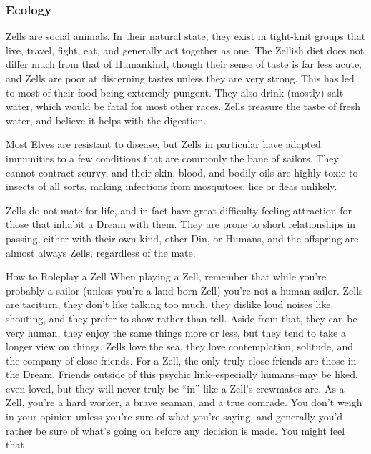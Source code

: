 \documentclass[oneside,11pt,english]{book}
\begin{document}
 

\subsubsection*{Ecology} 
Zells are social animals. In their natural state, they exist in tight-knit groups that live, travel, fight, eat, and 
generally act together as one. The Zellish diet does not differ much from that of Humankind, though their 
sense of taste is far less acute, and Zells are poor at discerning tastes unless they are very strong. This has 
led to most of their food being extremely pungent. They also drink (mostly) salt water, which would be 
fatal for most other races. Zells treasure the taste of fresh water, and believe it helps with the digestion. 

 

Most Elves are resistant to disease, but Zells in particular have adapted immunities to a few conditions 
that are commonly the bane of sailors. They cannot contract scurvy, and their skin, blood, and bodily oils 
are highly toxic to insects of all sorts, making infections from mosquitoes, lice or fleas unlikely. 

 

Zells do not mate for life, and in fact have great difficulty feeling attraction for those that inhabit a Dream 
with them. They are prone to short relationships in passing, either with their own kind, other Din, or 
Humans, and the offspring are almost always Zells, regardless of the mate. 

 

How to Roleplay a Zell 
When playing a Zell, remember that while you’re probably a sailor (unless you’re a land-born Zell) 
you’re not a human sailor. Zells are taciturn, they don’t like talking too much, they dislike loud noises 
like shouting, and they prefer to show rather than tell. Aside from that, they can be very human, they 
enjoy the same things more or less, but they tend to take a longer view on things. Zells love the sea, they 
love contemplation, solitude, and the company of close friends. For a Zell, the only truly close friends are 
those in the Dream. Friends outside of this psychic link--especially humans--may be liked, even loved, 
but they will never truly be “in” like a Zell’s crewmates are. As a Zell, you’re a hard worker, a brave 
seaman, and a true comrade. You don’t weigh in your opinion unless you’re sure of what you’re saying, 
and generally you’d rather be sure of what’s going on before any decision is made. You might feel that 
\end{document}
